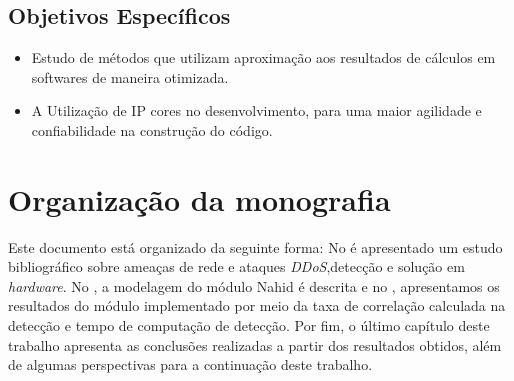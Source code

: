 \subsection{Objetivos Específicos}
\begin{itemize}
	
	\item  Estudo de métodos que utilizam aproximação aos resultados de cálculos em softwares de maneira otimizada.
	
	\item A Utilização de IP cores no desenvolvimento, para uma maior agilidade e confiabilidade na construção do código. 
	
\end{itemize}
\section{Organização da monografia}
Este documento está organizado da seguinte forma: No  é apresentado um estudo bibliográfico sobre ameaças de rede e ataques \textit{DDoS},detecção e solução em \textit{hardware}. No , a modelagem do módulo Nahid é descrita e no , apresentamos os resultados  do módulo implementado por meio da taxa de correlação calculada na detecção e tempo de computação de detecção. Por fim, o último capítulo deste trabalho apresenta as conclusões realizadas a partir dos resultados obtidos, além de algumas perspectivas para a continuação deste trabalho.